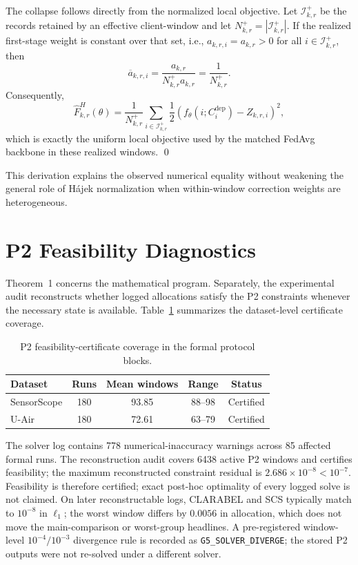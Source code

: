 The collapse follows directly from the normalized local objective.  Let
$\mathcal I_{k,r}^{+}$ be the records retained by an effective client-window
and let $N_{k,r}^{+}=|\mathcal I_{k,r}^{+}|$.  If the realized first-stage
weight is constant over that set, i.e.,
$a_{k,r,i}=a_{k,r}>0$ for all $i\in\mathcal I_{k,r}^{+}$, then
\begin{equation}
 \overline a_{k,r,i}
 =
 \frac{a_{k,r}}
 {N_{k,r}^{+}a_{k,r}}
 =
 \frac{1}{N_{k,r}^{+}}.
 \label{eq:app_local_hajek_uniform}
\end{equation}
Consequently,
\begin{equation}
 \widehat F^H_{k,r}(\theta)
 =
 \frac{1}{N_{k,r}^{+}}
 \sum_{i\in\mathcal I_{k,r}^{+}}
 \frac{1}{2}
 \left(
 f_\theta(i;C_i^{\mathrm{dep}})-Z_{k,r,i}
 \right)^2,
 \label{eq:app_local_hajek_collapse}
\end{equation}
which is exactly the uniform local objective used by the matched FedAvg
backbone in these realized windows.
\qed

This derivation explains the observed
numerical equality without weakening the general role of H\'ajek normalization
when within-window correction weights are heterogeneous.


\section{P2 Feasibility Diagnostics}
\label{app:p2_diagnostics}

Theorem~1 concerns the mathematical program.  Separately, the
experimental audit reconstructs whether logged allocations satisfy the P2
constraints whenever the necessary state is available.  Table~\ref{tab:app_p2_coverage}
summarizes the dataset-level certificate coverage.

\begin{table}[!t]
\centering
\caption{P2 feasibility-certificate coverage in the formal protocol blocks.}
\label{tab:app_p2_coverage}
\footnotesize
\setlength{\tabcolsep}{4pt}
\begin{tabular*}{\columnwidth}{@{\extracolsep{\fill}}lcccc}
\toprule
Dataset & Runs & Mean windows & Range & Status\\
\midrule
SensorScope & 180 & 93.85 & 88--98 & Certified \\
U-Air & 180 & 72.61 & 63--79 & Certified \\
\bottomrule
\end{tabular*}
\end{table}

The solver log contains 778 numerical-inaccuracy warnings across
85 affected formal runs.  The reconstruction audit covers
6438 active P2 windows and certifies feasibility; the maximum
reconstructed constraint residual is
$2.686\times10^{-8}<10^{-7}$.  Feasibility is therefore certified;
exact post-hoc optimality of every logged solve is not claimed.
On later reconstructable logs, CLARABEL and SCS typically match to
$10^{-8}$ in $\ell_1$; the worst window differs by $0.0056$ in
allocation, which does not move the main-comparison or worst-group
headlines.  A pre-registered window-level
$10^{-4}/10^{-3}$ divergence rule is recorded as
\texttt{G5\_SOLVER\_DIVERGE}; the stored P2 outputs were not re-solved under a different solver.

